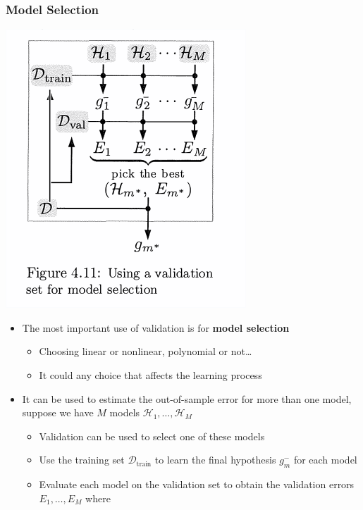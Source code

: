 \documentclass[11pt]{article}
\begin{document}
\subsubsection{Model Selection}
\label{sec:orgc695f2a}
\begin{center}
\includegraphics[width=.9\linewidth]{Overfitting (4)/screenshot_2018-09-18_09-48-43.png}
\end{center}
\begin{itemize}
\item The most important use of validation is for \textbf{model selection}
\begin{itemize}
\item Choosing linear or nonlinear, polynomial or not\ldots{}
\item It could any choice that affects the learning process
\end{itemize}

\item It can be used to estimate the out-of-sample error for more than one model, suppose we have \(M\) models \(\mathcal H_1, \dots, \mathcal H_M\) 
\begin{itemize}
\item Validation can be used to select one of these models
\item Use the training set \(\mathcal D_\text{train}\) to learn the final hypothesis \(g^-_m\) for each model
\item Evaluate each model on the validation set to obtain the validation errors \(E_1,\dots,E_M\) where
\end{itemize}
\end{itemize}
\end{document}
